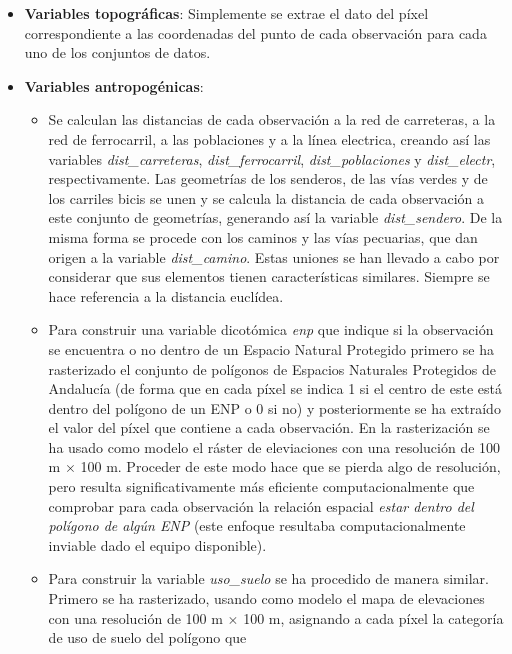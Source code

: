 \documentclass[12pt,a4paper,]{book}
\numberwithin{dummy}{section}
\theoremstyle{ocrenumbox}
\theoremstyle{blacknumex}
\theoremstyle{blacknumbox}
\theoremstyle{ocrenum}
\theoremstyle{ocrenum}
\begin{document}
\begin{itemize}
\item
  \textbf{Variables topográficas}: Simplemente se extrae el dato del
  píxel correspondiente a las coordenadas del punto de cada observación
  para cada uno de los conjuntos de datos.
\item
  \textbf{Variables antropogénicas}:

  \begin{itemize}
  \item
    Se calculan las distancias de cada observación a la red de
    carreteras, a la red de ferrocarril, a las poblaciones y a la línea
    electrica, creando así las variables \emph{dist\_carreteras},
    \emph{dist\_ferrocarril}, \emph{dist\_poblaciones} y
    \emph{dist\_electr}, respectivamente. Las geometrías de los
    senderos, de las vías verdes y de los carriles bicis se unen y se
    calcula la distancia de cada observación a este conjunto de
    geometrías, generando así la variable \emph{dist\_sendero}. De la
    misma forma se procede con los caminos y las vías pecuarias, que dan
    origen a la variable \emph{dist\_camino}. Estas uniones se han
    llevado a cabo por considerar que sus elementos tienen
    características similares. Siempre se hace referencia a la distancia
    euclídea.
  \item
    Para construir una variable dicotómica \emph{enp} que indique si la
    observación se encuentra o no dentro de un Espacio Natural Protegido
    primero se ha rasterizado el conjunto de polígonos de Espacios
    Naturales Protegidos de Andalucía (de forma que en cada píxel se
    indica 1 si el centro de este está dentro del polígono de un ENP o 0
    si no) y posteriormente se ha extraído el valor del píxel que
    contiene a cada observación. En la rasterización se ha usado como
    modelo el ráster de eleviaciones con una resolución de 100 m
    \(\times\) 100 m. Proceder de este modo hace que se pierda algo de
    resolución, pero resulta significativamente más eficiente
    computacionalmente que comprobar para cada observación la relación
    espacial \emph{estar dentro del polígono de algún ENP} (este enfoque
    resultaba computacionalmente inviable dado el equipo disponible).
  \item
    Para construir la variable \emph{uso\_suelo} se ha procedido de
    manera similar. Primero se ha rasterizado, usando como modelo el
    mapa de elevaciones con una resolución de 100 m \(\times\) 100 m,
    asignando a cada píxel la categoría de uso de suelo del polígono que

\end{itemize}
\end{itemize}
\end{document}
